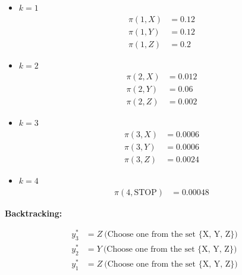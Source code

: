 \documentclass[11pt,fancychapters]{article}
\begin{document}
\begin{itemize}
	\item[] $k = 1$
	\begin{align*}
		\pi(1, X) &= 0.12 \\
		\pi(1, Y) &= 0.12 \\
		\pi(1, Z) &= 0.2
	\end{align*}
	
	\item[] $k = 2$
	\begin{align*}
		\pi(2, X) &= 0.012 \\
		\pi(2, Y) &= 0.06 \\
		\pi(2, Z) &= 0.002
	\end{align*}

	\item[] $k = 3$
	\begin{align*}
		\pi(3, X) &= 0.0006 \\
		\pi(3, Y) &= 0.0006 \\
		\pi(3, Z) &= 0.0024
	\end{align*}
	
	\item[] $k = 4$
	\begin{align*}
		\pi(4, \text{STOP}) &= 0.00048
	\end{align*}
\end{itemize}

\textbf{Backtracking:}

\begin{align*}
	y_3^* &= Z ~ \text{(Choose one from the set \{X, Y, Z\})} \\
	y_2^* &= Y ~ \text{(Choose one from the set \{X, Y, Z\})} \\
	y_1^* &= Z ~ \text{(Choose one from the set \{X, Y, Z\})}
\end{align*}
\end{document}
